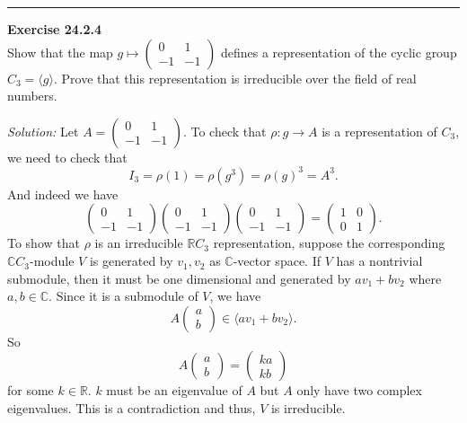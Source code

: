 \documentclass[a4paper, 12pt]{article}
\newenvironment{problem}[2][Exercise]
    { \begin{mdframed}[backgroundcolor=gray!20] \textbf{#1 #2} \\}
    {  \end{mdframed}}
\newenvironment{solution}
    {\textit{Solution:}}
    {}
\newcommand{\la}{\langle}
\newcommand{\ra}{\rangle}
\begin{document}
\noindent\rule{7in}{2.8pt}
\begin{problem}{24.2.4}
Show that the map \(g\mapsto \begin{pmatrix}
	0&1\\ 
	-1&-1
\end{pmatrix}\) defines a representation of the cyclic group \(C_3=\la g\ra\). Prove that this representation is irreducible over the field of real numbers.
\end{problem}
\begin{solution}
Let \(A=\begin{pmatrix}
	0&1\\ 
	-1&-1
\end{pmatrix}\). To check that \(\rho:g\rightarrow A\) is a representation of \(C_3\), we need to check that 
\[I_3=\rho(1)=\rho(g^3)=\rho(g)^3=A^3.\]
And indeed we have
\[\begin{pmatrix}
	0&1\\ 
	-1&-1
\end{pmatrix}\begin{pmatrix}
	0&1\\ 
	-1&-1
\end{pmatrix}\begin{pmatrix}
	0&1\\ 
	-1&-1
\end{pmatrix}=\begin{pmatrix}
	1&0\\ 
	0&1
\end{pmatrix}.\]
To show that \(\rho\) is an irreducible \(\mathbb{R}C_3\) representation, suppose the corresponding \(\mathbb{C}C_3\)-module \(V\) is generated by \(v_1,v_2\) as \(\mathbb{C}\)-vector space. If \(V\) 
has a nontrivial submodule, then it must be one dimensional and generated by \(av_1+bv_2\) where \(a,b\in \mathbb{C}\). Since it is a submodule of \(V\), we have 
\[A\begin{pmatrix}
	a\\ 
	b
\end{pmatrix}\in \la av_1+bv_2\ra.\]
So 
\[A\begin{pmatrix}
	a\\ 
	b
\end{pmatrix}=\begin{pmatrix}
	ka\\ 
	kb
\end{pmatrix}\]
for some \(k\in \mathbb{R}\). \(k\) must be an eigenvalue of \(A\) but \(A\) only have two complex eigenvalues. This is a contradiction and thus, \(V\) is irreducible.
\end{solution}
\end{document}
